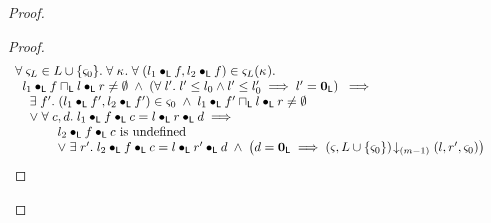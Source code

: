 \begin{lemma}[]
\begin{proof}
\begin{proof}
\begin{align}
	&\begin{array}{l}
		\forall\; \varsigma_{L} \in L \cup \{\varsigma_{0}\}.\; \forall\; \kappa_{}.\; \forall\; (l_1 \bullet_{\textsf{L}} f, l_2 \bullet_{\textsf{L}} f) \in \varsigma_{L}(\kappa_{}).\; \\
  \hspace*{0.2cm} l_1 \bullet_{\textsf{L}} f \sqcap_{\textsf{L}} l \bullet_{\textsf{L}} r \not= \emptyset \;\land\; \left(\forall\; l'.\; l' \leq l_0 \land l' \leq l'_0 \implies l' = \mathbf{0}_{\textsf{L}}\right)  \;\implies\\
  \hspace*{0.4cm}\exists\; f'.\; (l_1 \bullet_{\textsf{L}} f', l_2 \bullet_{\textsf{L}} f') \in \varsigma_{0} \;\land\; l_1 \bullet_{\textsf{L}} f' \sqcap_{\textsf{L}} l \bullet_{\textsf{L}} r \not= \emptyset\\
		\hspace*{0.4cm}\lor\;\forall\; c, d.\;  l_1 \bullet_{\textsf{L}} f \bullet_{\textsf{L}} c = l \bullet_{\textsf{L}} r \bullet_{\textsf{L}} d \implies\\
		\hspace*{1cm}
		\begin{array}{l l}
			l_2 \bullet_{\textsf{L}} f \bullet_{\textsf{L}} c \text{ is undefined}\\
			\lor\; \exists\; r'.\; l_2 \bullet_{\textsf{L}} f \bullet_{\textsf{L}} c = l \bullet_{\textsf{L}} r' \bullet_{\textsf{L}} d \;\land\; \left( d = \mathbf{0}_{\textsf{L}} \implies \left(\varsigma_{}, L \cup \{\varsigma_{0}\}\right) \!\downarrow_{(m-1)} \left(l, r', \varsigma_{0}\right)\right)
		\end{array}
	\end{array} \label{LAW:Goal9}
\end{align}
%


\end{proof}
\end{proof}
\end{lemma}
